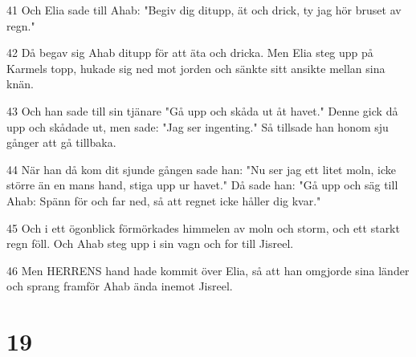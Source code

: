 \par 41 Och Elia sade till Ahab: "Begiv dig ditupp, ät och drick, ty jag hör bruset av regn."
\par 42 Då begav sig Ahab ditupp för att äta och dricka. Men Elia steg upp på Karmels topp, hukade sig ned mot jorden och sänkte sitt ansikte mellan sina knän.
\par 43 Och han sade till sin tjänare "Gå upp och skåda ut åt havet." Denne gick då upp och skådade ut, men sade: "Jag ser ingenting." Så tillsade han honom sju gånger att gå tillbaka.
\par 44 När han då kom dit sjunde gången sade han: "Nu ser jag ett litet moln, icke större än en mans hand, stiga upp ur havet." Då sade han: "Gå upp och säg till Ahab: Spänn för och far ned, så att regnet icke håller dig kvar."
\par 45 Och i ett ögonblick förmörkades himmelen av moln och storm, och ett starkt regn föll. Och Ahab steg upp i sin vagn och for till Jisreel.
\par 46 Men HERRENS hand hade kommit över Elia, så att han omgjorde sina länder och sprang framför Ahab ända inemot Jisreel.

\chapter{19}

